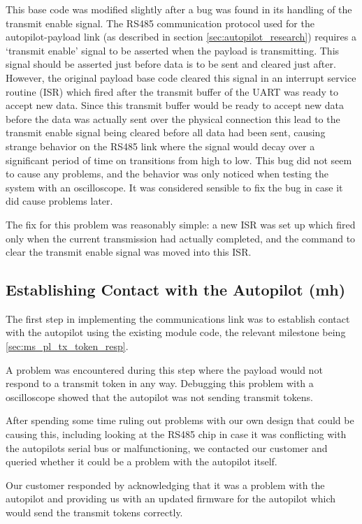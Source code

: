 This base code was modified slightly after a bug was found in its handling of 
the transmit enable signal. The RS485 communication protocol used for the 
autopilot-payload link (as described in section \ref{sec:autopilot_research}) 
requires a `transmit enable' signal to be asserted when the payload is 
transmitting. This signal should be asserted just before data is to be sent 
and cleared just after. However, the original payload base code cleared this 
signal in an interrupt service routine (ISR) which fired after the transmit 
buffer of the UART was ready to accept new data. Since this transmit buffer 
would be ready to accept new data before the data was actually sent over the
physical connection this lead to the transmit enable signal being cleared
before all data had been sent, causing strange behavior on the RS485 link where the signal would decay over a significant period of time on transitions from high to low.
This bug did not seem to cause any problems, and the behavior was only
noticed when testing the system with an oscilloscope.
It was considered sensible to fix the bug in case it did cause problems later.

The fix for this problem was reasonably simple: a new ISR was set up which 
fired only when the current transmission had actually completed, and the 
command to clear the transmit enable signal was moved into this ISR.

\subsection{Establishing Contact with the Autopilot (mh)}

The first step in implementing the communications link was to establish contact with
the autopilot using the existing module code, the relevant milestone being
\ref{sec:ms_pl_tx_token_resp}. 

A problem was encountered during this step where the payload would not 
respond to a transmit token in any way. Debugging this problem with a 
oscilloscope showed that the autopilot was not sending transmit tokens.

After spending some time ruling out problems with our own design that could be
causing this, including looking at the RS485 chip in case it was conflicting with the
autopilots serial bus or malfunctioning, we contacted our customer and queried 
whether it could be a problem with the autopilot itself.

Our customer responded by acknowledging that it was a problem with the autopilot
and providing us with an updated firmware for the autopilot
which would send the transmit tokens correctly.

